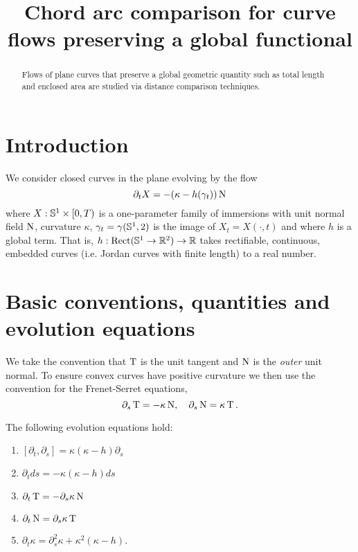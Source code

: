 \documentclass[a4paper, 12pt]{amsart}
\title[Chord arc comparison for preserving flows]{Chord arc comparison for curve flows preserving a global functional}
\date{}
\begin{document}
\begin{abstract}
Flows of plane curves that preserve a global geometric quantity such as total length and enclosed area are studied via distance comparison techniques.
\end{abstract}

\maketitle

\section{Introduction}
\label{sec:intro}

We consider closed curves in the plane evolving by the flow
\begin{equation}
\label{eq:flow}
\partial_t X = -(\kappa - h(\gamma_t)) \nor
\end{equation}
where \(X : \S^1 \times [0, T)\) is a one-parameter family of immersions with unit normal field \(\nor\), curvature \(\kappa\), \(\gamma_t = \gamma(\S^1, 2)\) is the image of \(X_t = X(\cdot, t)\) and where \(h\) is a global term. That is, \(h : \rect (\S^1 \to \R^2) \to \R\) takes rectifiable, continuous, embedded curves (i.e. Jordan curves with finite length) to a real number.

\section{Basic conventions, quantities and evolution equations}
\label{sec:basic}

We take the convention that \(\tang\) is the unit tangent and \(\nor\) is the \emph{outer} unit normal. To ensure convex curves have positive curvature we then use the convention for the Frenet-Serret equations,
\begin{equation}
\label{eq:fs}
\partial_s \tang = - \kappa \nor, \quad \partial_s \nor = \kappa \tang.
\end{equation}

\begin{lemma}
\label{lem:basic_evolution}
The following evolution equations hold:
\begin{enumerate}
\item \([\partial_t, \partial_s] = \kappa(\kappa - h) \partial_s\)
\item \(\partial_t ds = -\kappa(\kappa - h) ds\)
\item \(\partial_t \tang = -\partial_s \kappa\nor\)
\item \(\partial_t \nor = \partial_s \kappa \tang\)
\item \(\partial_t \kappa = \partial_s^2 \kappa + \kappa^2(\kappa - h)\).
\end{enumerate}
\end{lemma}
\end{document}
